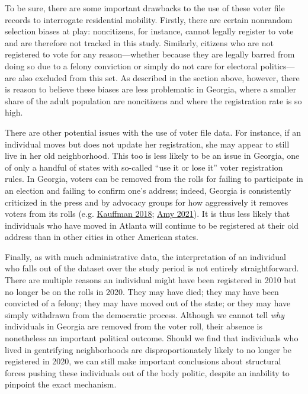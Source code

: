 \documentclass[
  12pt,
]{article}
\begin{document}
To be sure, there are some important drawbacks to the use of these voter file records to interrogate residential mobility. Firstly, there are certain nonrandom selection biases at play: noncitizens, for instance, cannot legally register to vote and are therefore not tracked in this study. Similarly, citizens who are not registered to vote for any reason---whether because they are legally barred from doing so due to a felony conviction or simply do not care for electoral politics---are also excluded from this set. As described in the section above, however, there is reason to believe these biases are less problematic in Georgia, where a smaller share of the adult population are noncitizens and where the registration rate is so high.

There are other potential issues with the use of voter file data. For instance, if an individual moves but does not update her registration, she may appear to still live in her old neighborhood. This too is less likely to be an issue in Georgia, one of only a handful of states with so-called ``use it or lose it'' voter registration rules. In Georgia, voters can be removed from the rolls for failing to participate in an election and failing to confirm one's address; indeed, Georgia is consistently criticized in the press and by advocacy groups for how aggressively it removes voters from its rolls (e.g. \protect\hyperlink{ref-Kauffman2018}{Kauffman 2018}; \protect\hyperlink{ref-Amy2021}{Amy 2021}). It is thus less likely that individuals who have moved in Atlanta will continue to be registered at their old address than in other cities in other American states.

Finally, as with much administrative data, the interpretation of an individual who falls out of the dataset over the study period is not entirely straightforward. There are multiple reasons an individual might have been registered in 2010 but no longer be on the rolls in 2020. They may have died; they may have been convicted of a felony; they may have moved out of the state; or they may have simply withdrawn from the democratic process. Although we cannot tell \emph{why} individuals in Georgia are removed from the voter roll, their absence is nonetheless an important political outcome. Should we find that individuals who lived in gentrifying neighborhoods are disproportionately likely to no longer be registered in 2020, we can still make important conclusions about structural forces pushing these individuals out of the body politic, despite an inability to pinpoint the exact mechanism.
\end{document}
